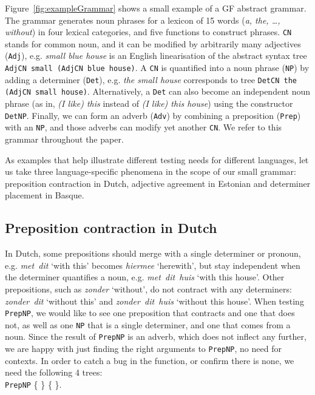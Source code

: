 \documentclass[11pt]{article}
\def\t#1{\texttt{#1}}
\begin{document}
Figure~\ref{fig:exampleGrammar} shows a small example of a GF abstract
grammar. The grammar generates noun phrases for a lexicon of 15
words (\emph{a, the, \dots, without}) in four lexical categories,
and five functions to construct phrases. \t{CN} stands for common
noun, and it can be modified by arbitrarily many adjectives (\t{Adj}),
e.g. \emph{small blue house} is an English linearisation of the
abstract syntax tree \t{AdjCN small (AdjCN blue house)}. A \t{CN} is
quantified into a noun phrase (\t{NP}) by adding a determiner
(\t{Det}), e.g. \emph{the small house} corresponds to tree \t{DetCN the (AdjCN small
  house)}. Alternatively, a \t{Det} can also become an independent
noun phrase (as in, \emph{(I like) this} instead of \emph{(I like) this
  house}) using the constructor \t{DetNP}. Finally, we can form an
adverb (\t{Adv}) by combining a preposition (\t{Prep}) with an \t{NP},
and those adverbs can modify yet another \t{CN}. 
We refer to this grammar throughout the paper.

As examples that help illustrate different testing needs for different languages, let us take three language-specific phenomena in the scope of our
small grammar: preposition contraction in Dutch, adjective agreement
in Estonian and determiner placement in Basque.

\subsection{Preposition contraction in Dutch} In Dutch, some prepositions should
merge with a single determiner or pronoun, e.g. \emph{met~dit} `with
this' becomes \emph{hiermee} `herewith', but stay independent when the
determiner quantifies a noun, e.g. \emph{met~dit~huis} `with this house'. 
Other prepositions, such as \emph{zonder} `without', do not
contract with any determiners: \emph{zonder~dit} `without this' and
\emph{zonder~dit~huis} `without this house'.
When testing \t{PrepNP}, we would like to see one preposition that
contracts and one that does not, as well as one \t{NP} that is a
single determiner, and one that comes from a noun. Since the result of
\t{PrepNP} is an adverb, which does not inflect any further, we are
happy with just finding the right arguments to \t{PrepNP}, no need for contexts.
In order to catch a bug in the function, or confirm there is none, we
need the following 4 trees: \\
\t{PrepNP} \{  \} 
           \{  \}. 
\end{document}
